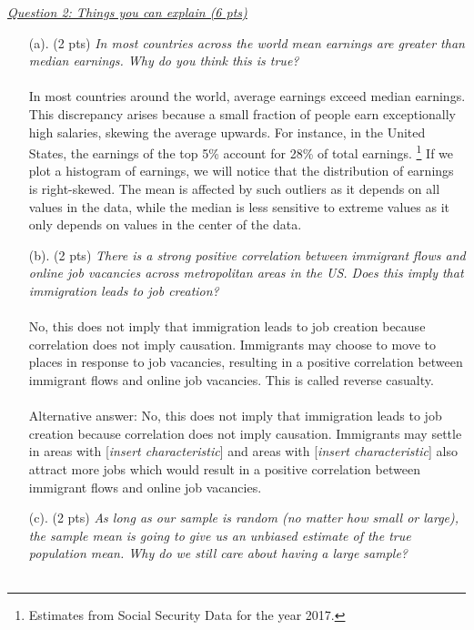 \documentclass{./../../Latex/tests}
\begin{document}
\newpage 
\underline{\textit{Question 2: Things you can explain (6 pts)}} \\
\begin{enumerate}
\item[(a).] (2 pts) \textit{In most countries across the world mean earnings are greater than median earnings. Why do you think this is true?}  \\~\\
In most countries around the world, average earnings exceed median earnings. This discrepancy arises because a small fraction of people earn exceptionally high salaries, skewing the average upwards. For instance, in the United States, the earnings of the top 5\% account for 28\% of total earnings. \footnote{Estimates from Social Security Data for the year 2017.}  If we plot a histogram of earnings, we will notice that the distribution of earnings is right-skewed. The mean is affected by such outliers as it depends on all values in the data, while the median is less sensitive to extreme values as it only depends on values in the center of the data. \\
\item[(b).] (2 pts) \textit{There is a strong positive correlation between immigrant flows and online job vacancies across metropolitan areas in the US. Does this imply that immigration leads to job creation? } \\~\\
No, this does not imply that immigration leads to job creation because correlation does not imply causation. Immigrants may choose to move to places in response to job vacancies, resulting in a positive correlation between immigrant flows and online job vacancies. This is called reverse casualty. \\~\\
Alternative answer: No, this does not imply that immigration leads to job creation because correlation does not imply causation. Immigrants may settle in areas with [\textit{insert characteristic}] and areas with [\textit{insert characteristic}] also attract more jobs which would result in a positive correlation between immigrant flows and online job vacancies. \\
\newpage
\item[(c).] (2 pts) \textit{As long as our sample is random (no matter how small or large), the sample mean is going to give us an unbiased estimate of the true population mean. Why do we still care about having a large sample?} \\~\\

\end{enumerate}
\end{document}
